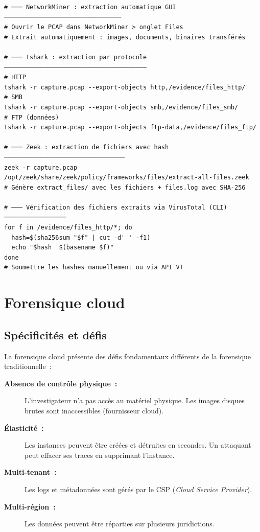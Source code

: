 \begin{lstlisting}[style=StyleTerminal,
  caption={Extraction de fichiers depuis un PCAP},
  label={lst:pcap-extraction}]
# ─── NetworkMiner : extraction automatique GUI ────────────────────────────────
# Ouvrir le PCAP dans NetworkMiner > onglet Files
# Extrait automatiquement : images, documents, binaires transférés

# ─── tshark : extraction par protocole ───────────────────────────────────────
# HTTP
tshark -r capture.pcap --export-objects http,/evidence/files_http/
# SMB
tshark -r capture.pcap --export-objects smb,/evidence/files_smb/
# FTP (données)
tshark -r capture.pcap --export-objects ftp-data,/evidence/files_ftp/

# ─── Zeek : extraction de fichiers avec hash ─────────────────────────────────
zeek -r capture.pcap /opt/zeek/share/zeek/policy/frameworks/files/extract-all-files.zeek
# Génère extract_files/ avec les fichiers + files.log avec SHA-256

# ─── Vérification des fichiers extraits via VirusTotal (CLI) ─────────────────
for f in /evidence/files_http/*; do
  hash=$(sha256sum "$f" | cut -d' ' -f1)
  echo "$hash  $(basename $f)"
done
# Soumettre les hashes manuellement ou via API VT
\end{lstlisting}

\section{Forensique cloud}
\label{sec:forensics-cloud}

\subsection{Spécificités et défis}

La forensique cloud présente des défis fondamentaux différents de la
forensique traditionnelle~:

\begin{description}
  \item[\textbf{Absence de contrôle physique~:}] L'investigateur n'a
        pas accès au matériel physique. Les images disques brutes sont
        inaccessibles (fournisseur cloud).
  \item[\textbf{Élasticité~:}] Les instances peuvent être créées et
        détruites en secondes. Un attaquant peut effacer ses traces en
        supprimant l'instance.
  \item[\textbf{Multi-tenant~:}] Les logs et métadonnées sont gérés par
        le CSP (\textit{Cloud Service Provider}).
  \item[\textbf{Multi-région~:}] Les données peuvent être réparties sur
        plusieurs juridictions.
\end{description}

